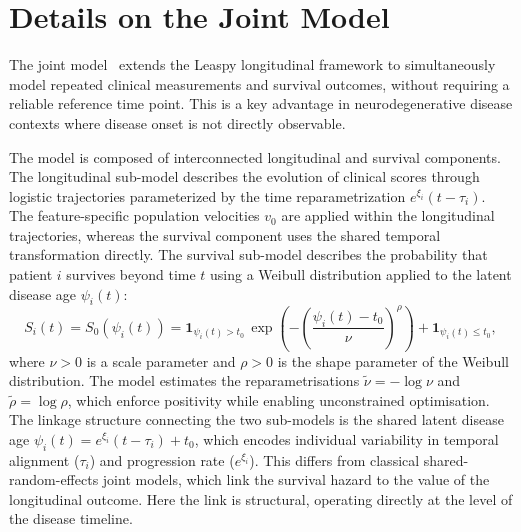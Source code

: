 \documentclass{rapportCS}
\begin{document}
\newpage 

\section{Details on the Joint Model}

The joint model~\cite{ortholand2026joint} extends the Leaspy longitudinal framework to simultaneously model repeated clinical measurements and survival outcomes, without requiring a reliable reference time point. This is a key advantage in neurodegenerative disease contexts where disease onset is not directly observable.

The model is composed of interconnected longitudinal and survival components. The longitudinal sub-model describes the evolution of clinical scores through logistic trajectories parameterized by the time reparametrization $e^{\xi_i}(t-\tau_i)$. The feature-specific population velocities $v_0$ are applied within the longitudinal trajectories, whereas the survival component uses the shared temporal transformation directly. The survival sub-model describes the probability that patient $i$ survives beyond time $t$ using a Weibull distribution applied to the latent disease age $\psi_i(t)$:
\begin{equation}
  S_i(t) = S_0(\psi_i(t)) = \mathbf{1}_{\psi_i(t) > t_0}\, \exp\!\left(-\left(\frac{\psi_i(t) - t_0}{\nu}\right)^{\rho}\right) + \mathbf{1}_{\psi_i(t) \leq t_0},
\end{equation}
where $\nu > 0$ is a scale parameter and $\rho > 0$ is the shape parameter of the Weibull distribution. The model estimates the reparametrisations $\tilde{\nu} = -\log\nu$ and $\tilde{\rho} = \log\rho$, which enforce positivity while enabling unconstrained optimisation. The linkage structure connecting the two sub-models is the shared latent disease age $\psi_i(t) = e^{\xi_i}(t - \tau_i) + t_0$, which encodes individual variability in temporal alignment ($\tau_i$) and progression rate ($e^{\xi_i}$). This differs from classical shared-random-effects joint models, which link the survival hazard to the value of the longitudinal outcome. Here the link is structural, operating directly at the level of the disease timeline.
\end{document}
